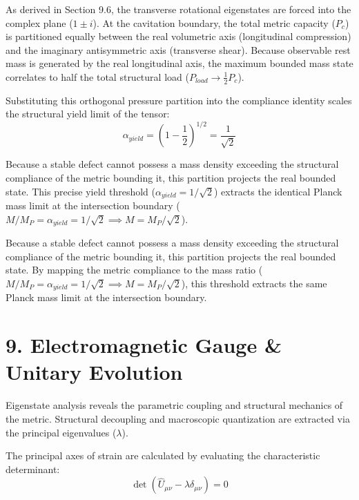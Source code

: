 As derived in Section 9.6, the transverse rotational eigenstates are forced into the complex plane ($1 \pm i$). At the cavitation boundary, the total metric capacity ($P_c$) is partitioned equally between the real volumetric axis (longitudinal compression) and the imaginary antisymmetric axis (transverse shear). Because observable rest mass is generated by the real longitudinal axis, the maximum bounded mass state correlates to half the total structural load ($P_{load} \to \frac{1}{2} P_c$). 

Substituting this orthogonal pressure partition into the compliance identity scales the structural yield limit of the tensor: 
\begin{equation}
    \alpha_{yield} = \left( 1 - \frac{1}{2} \right)^{1/2} = \frac{1}{\sqrt{2}}
\end{equation}

Because a stable defect cannot possess a mass density exceeding the structural compliance of the metric bounding it, this partition projects the real bounded state. This precise yield threshold ($\alpha_{yield} = 1/\sqrt{2}$) extracts the identical Planck mass limit at the intersection boundary ($M/M_P = \alpha_{yield} = 1/\sqrt{2} \implies M = M_P/\sqrt{2}$).

Because a stable defect cannot possess a mass density exceeding the structural compliance of the metric bounding it, this partition projects the real bounded state. By mapping the metric compliance to the mass ratio ($M/M_P = \alpha_{yield} = 1/\sqrt{2} \implies M = M_P/\sqrt{2}$), this threshold extracts the same Planck mass limit at the intersection boundary. 



\section*{9. Electromagnetic Gauge \& Unitary Evolution} 
Eigenstate analysis reveals the parametric coupling and structural mechanics of the metric. Structural decoupling and macroscopic quantization are extracted via the principal eigenvalues ($\lambda$).

The principal axes of strain are calculated by evaluating the characteristic determinant: 
\begin{equation} 
    \det(\hat{U}_{\mu\nu} - \lambda \delta_{\mu\nu}) = 0 
\end{equation} 

